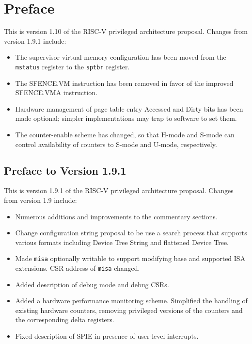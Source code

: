 \chapter{Preface}

This is version 1.10 of the RISC-V privileged architecture
proposal.  Changes from version 1.9.1 include:

\begin{itemize}
  \parskip 0pt
  \itemsep 1pt
\item The supervisor virtual memory configuration has been moved from the
      {\tt mstatus} register to the {\tt sptbr} register.
\item The SFENCE.VM instruction has been removed in favor of the improved
      SFENCE.VMA instruction.
\item Hardware management of page table entry Accessed and Dirty bits has
      been made optional; simpler implementations may trap to software to
      set them.
\item The counter-enable scheme has changed, so that H-mode and S-mode can
      control availability of counters to S-mode and U-mode, respectively.
\end{itemize}

\section*{Preface to Version 1.9.1}

This is version 1.9.1 of the RISC-V privileged architecture
proposal.  Changes from version 1.9 include:

\begin{itemize}
  \parskip 0pt
  \itemsep 1pt
\item Numerous additions and improvements to the commentary sections.
\item Change configuration string proposal to be use a search process
  that supports various formats including Device Tree String and
  flattened Device Tree.
\item Made {\tt misa} optionally writable to support modifying base
  and supported ISA extensions.  CSR address of {\tt misa} changed.
\item Added description of debug mode and debug CSRs.
\item Added a hardware performance monitoring scheme.  Simplified the
  handling of existing hardware counters, removing privileged versions
  of the counters and the corresponding delta registers.
\item Fixed description of SPIE in presence of user-level interrupts.
\end{itemize}
